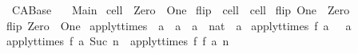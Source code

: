 %
\begin{isabellebody}%
%
%
\isadelimdocument
%
\endisadelimdocument
%
\isatagdocument
%
\isamarkuptrue%
%
\endisatagdocument
{\isafolddocument}%
%
\isadelimdocument
%
\endisadelimdocument
%
\isadelimtheory
%
\endisadelimtheory
%
\isatagtheory
{}\isamarkupfalse%
\ CA{\isacharunderscore}Base\isanewline
\ \ \ Main\isanewline
{}%
\endisatagtheory
{\isafoldtheory}%
%
\isadelimtheory
\isanewline
%
\endisadelimtheory
\isanewline
{}\isamarkupfalse%
\ cell\ {\isacharequal}\ Zero\ {\isacharbar}\ One\isanewline
\isanewline
{}\isamarkupfalse%
\ flip\ {\isacharcolon}{\isacharcolon}\ {\isachardoublequoteopen}cell\ {\isasymRightarrow}\ cell{\isachardoublequoteclose}\ \isanewline
{\isachardoublequoteopen}flip\ One\ {\isacharequal}\ Zero{\isachardoublequoteclose}\ {\isacharbar}\isanewline
{\isachardoublequoteopen}flip\ Zero\ {\isacharequal}\ One{\isachardoublequoteclose}\isanewline
\isanewline
{}\isamarkupfalse%
\ apply{\isacharunderscore}t{\isacharunderscore}times\ {\isacharcolon}{\isacharcolon}\ {\isachardoublequoteopen}{\isacharparenleft}{\isacharprime}a\ {\isasymRightarrow}\ {\isacharprime}a{\isacharparenright}\ {\isasymRightarrow}\ {\isacharprime}a\ {\isasymRightarrow}\ nat\ {\isasymRightarrow}\ {\isacharprime}a{\isachardoublequoteclose}\ \isanewline
{\isachardoublequoteopen}apply{\isacharunderscore}t{\isacharunderscore}times\ f\ a\ {}\ {\isacharequal}\ a{\isachardoublequoteclose}\ {\isacharbar}\isanewline
{\isachardoublequoteopen}apply{\isacharunderscore}t{\isacharunderscore}times\ f\ a\ {\isacharparenleft}Suc\ n{\isacharparenright}\ {\isacharequal}\ apply{\isacharunderscore}t{\isacharunderscore}times\ f\ {\isacharparenleft}f\ a{\isacharparenright}\ n{\isachardoublequoteclose}\isanewline
%
\isadelimtheory
\isanewline
%
\endisadelimtheory
%
\isatagtheory
{}\isamarkupfalse%
%
\endisatagtheory
{\isafoldtheory}%
%
\isadelimtheory
%
\endisadelimtheory
%
\end{isabellebody}%
\endinput
